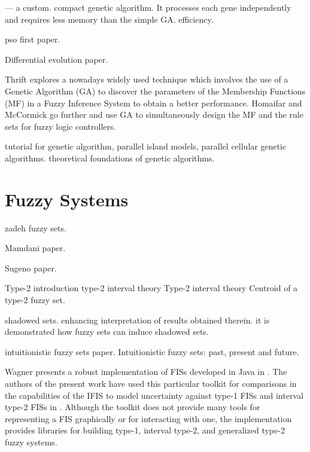 \cite{Harik1999} — a custom. compact genetic algorithm. It processes each gene
independently and requires less memory than the simple GA. efficiency.

\cite{Eberhart2002} pso first paper.

\cite{Price1997} Differential evolution paper.

Thrift \cite{Thrift1991} explores a nowadays widely used technique which
involves the use of a Genetic Algorithm (GA) to discover the parameters of the
Membership Functions (MF) in a Fuzzy Inference System to obtain a better
performance. Homaifar and McCormick \cite{Homaifar1995} go further and use GA to
simultaneously design the MF and the rule sets for fuzzy logic controllers.

\cite{Whitley1994} tutorial for genetic algorithm, parallel island models,
parallel cellular genetic algorithms. theoretical foundations of genetic
algorithms.

\section{Fuzzy Systems}
\label{section:fuzzy-systems}

\cite{Zadeh1965} zadeh fuzzy sets.

\cite{Mamdani1975} Mamdani paper.

\cite{Takagi1985} Sugeno paper.


\cite{Mendel2002} Type-2 introduction \cite{Mendel2006} type-2 interval theory
\cite{Liang2000} Type-2 interval theory \cite{Karnik2001} Centroid of a type-2
fuzzy set.

\cite{Pedrycz1998} shadowed sets. enhancing interpretation of results obtained
therein. it is demonstrated how fuzzy sets can induce shadowed sets.

\cite{Atanassov1986} intuitionistic fuzzy sets paper.  \cite{Atanassov2003}
Intuitionistic fuzzy sets: past, present and future.


Wagner presents a robust implementation of FISs developed in Java in
\cite{Wagner2013}. The authors of the present work have used this particular
toolkit for comparisons in the capabilities of the IFIS to model uncertainty
against type-1 FISs and interval type-2 FISs in
\cite{Hernandez-Aguila2016}. Although the toolkit does not provide many tools
for representing a FIS graphically or for interacting with one, the
implementation provides libraries for building type-1, interval type-2, and
generalized type-2 fuzzy systems.

